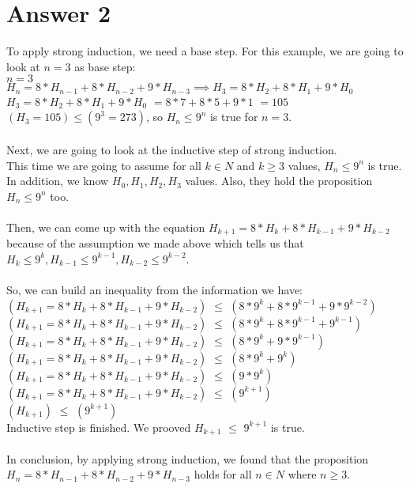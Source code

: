\documentclass[12pt]{article}
\begin{document}
\section*{Answer 2}
To apply strong induction, we need a base step. For this example, we are going to look at $n = 3$ as base step:\\
$n = 3$\\
$H_n = 8*H_{n-1} + 8*H_{n-2} + 9*H_{n-3}$$\implies$$H_3 = 8*H_{2} + 8*H_{1} + 9*H_{0}$\\
$H_3 = 8*H_{2} + 8*H_{1} + 9*H_{0}$ $= 8*7 + 8*5 + 9*1$ $= 105$\\
$(H_3 = 105) \leq (9^3 = 273)$, so $H_n \leq 9^n$ is true for $n = 3$.\\
\\
Next, we are going to look at the inductive step of strong induction.\\
This time we are going to assume for all $k \in N$ and $k \geq 3$ values, $H_n \leq 9^n$ is true. In addition, we know $H_0, H_1, H_2, H_3$ values. Also, they hold the proposition  $H_n \leq 9^n$ too.\\
\\
Then, we can come up with the equation $H_{k+1} = 8*H_{k} + 8*H_{k-1} + 9*H_{k-2}$ because of the assumption we made above which tells us that $H_{k} \leq 9^{k}, H_{k-1} \leq 9^{k-1}, H_{k-2} \leq 9^{k-2}$.\\
\\
So, we can build an inequality from the information we have:\\
$(H_{k+1} = 8*H_{k} + 8*H_{k-1} + 9*H_{k-2})$ $\leq$ $(8*9^{k} + 8*9^{k-1} + 9*9^{k-2})$\\
$(H_{k+1} = 8*H_{k} + 8*H_{k-1} + 9*H_{k-2})$ $\leq$ $(8*9^{k} + 8*9^{k-1} + 9^{k-1})$\\
$(H_{k+1} = 8*H_{k} + 8*H_{k-1} + 9*H_{k-2})$ $\leq$ $(8*9^{k} + 9*9^{k-1})$\\
$(H_{k+1} = 8*H_{k} + 8*H_{k-1} + 9*H_{k-2})$ $\leq$ $(8*9^{k} + 9^{k})$\\
$(H_{k+1} = 8*H_{k} + 8*H_{k-1} + 9*H_{k-2})$ $\leq$ $(9*9^{k})$\\
$(H_{k+1} = 8*H_{k} + 8*H_{k-1} + 9*H_{k-2})$ $\leq$ $(9^{k+1})$\\
$(H_{k+1})$ $\leq$ $(9^{k+1})$\\
Inductive step is finished. We prooved $H_{k+1}$ $\leq$ $9^{k+1}$ is true.\\
\\
In conclusion, by applying strong induction, we found that the proposition $H_n = 8*H_{n-1} + 8*H_{n-2} + 9*H_{n-3}$ holds for all $n \in N$ where $n \geq 3$.
\end{document}
